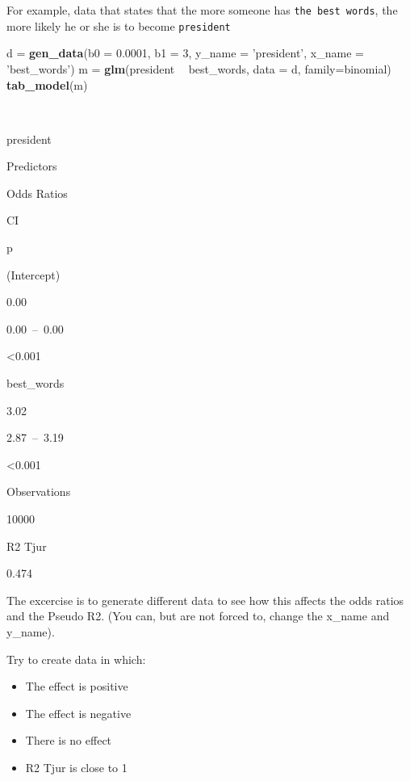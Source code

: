 \documentclass[
]{article}
\newenvironment{Shaded}{\begin{snugshade}}{\end{snugshade}}
\newcommand{\DataTypeTok}[1]{\textcolor[rgb]{0.13,0.29,0.53}{#1}}
\newcommand{\DecValTok}[1]{\textcolor[rgb]{0.00,0.00,0.81}{#1}}
\newcommand{\FloatTok}[1]{\textcolor[rgb]{0.00,0.00,0.81}{#1}}
\newcommand{\KeywordTok}[1]{\textcolor[rgb]{0.13,0.29,0.53}{\textbf{#1}}}
\newcommand{\NormalTok}[1]{#1}
\newcommand{\OperatorTok}[1]{\textcolor[rgb]{0.81,0.36,0.00}{\textbf{#1}}}
\newcommand{\StringTok}[1]{\textcolor[rgb]{0.31,0.60,0.02}{#1}}
\providecommand{\tightlist}{%
  \setlength{\itemsep}{0pt}\setlength{\parskip}{0pt}}
\begin{document}
For example, data that states that the more someone has
\texttt{the\ best\ words}, the more likely he or she is to become
\texttt{president}

\begin{Shaded}
\begin{Highlighting}[]
\NormalTok{d =}\StringTok{ }\KeywordTok{gen_data}\NormalTok{(}\DataTypeTok{b0 =} \FloatTok{0.0001}\NormalTok{, }\DataTypeTok{b1 =} \DecValTok{3}\NormalTok{, }\DataTypeTok{y_name =} \StringTok{'president'}\NormalTok{, }\DataTypeTok{x_name =} \StringTok{'best_words'}\NormalTok{)}
\NormalTok{m =}\StringTok{ }\KeywordTok{glm}\NormalTok{(president }\OperatorTok{~}\StringTok{ }\NormalTok{best_words, }\DataTypeTok{data =}\NormalTok{ d, }\DataTypeTok{family=}\NormalTok{binomial)}
\KeywordTok{tab_model}\NormalTok{(m)}
\end{Highlighting}
\end{Shaded}

~

president

Predictors

Odds Ratios

CI

p

(Intercept)

0.00

0.00~--~0.00

\textless0.001

best\_words

3.02

2.87~--~3.19

\textless0.001

Observations

10000

R2 Tjur

0.474

The excercise is to generate different data to see how this affects the
odds ratios and the Pseudo R2. (You can, but are not forced to, change
the x\_name and y\_name).

Try to create data in which:

\begin{itemize}
\tightlist
\item
  The effect is positive
\item
  The effect is negative
\item
  There is no effect
\item
  R2 Tjur is close to 1
\end{itemize}
\end{document}
